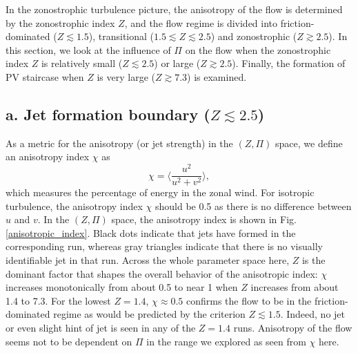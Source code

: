 \documentclass{ametsoc}
\begin{document}
In the zonostrophic turbulence picture, the anisotropy of the flow is
determined by the zonostrophic index $Z$, and the flow regime is
divided into friction-dominated ($Z\apprle1.5$), transitional ($1.5\apprle Z\apprle2.5$)
and zonostrophic ($Z\apprge2.5$). In this section, we look at the
influence of $\Pi$ on the flow when the zonostrophic index $Z$ is
relatively small ($Z\apprle2.5$) or large ($Z\apprge2.5$). Finally,
the formation of PV staircase when $Z$ is very large ($Z\apprge7.3$)
is examined.

\subsection*{a. Jet formation boundary ($Z\apprle2.5$)}

As a metric for the anisotropy (or jet strength)
in the $(Z,\Pi)$ space, we define an anisotropy index $\chi$ as
\begin{equation}
\chi=\langle\frac{u^{2}}{u^{2}+v^{2}}\rangle,
\end{equation}
which measures the percentage of energy in the zonal wind. For
isotropic turbulence, the anisotropy index $\chi$ should be 0.5
as there is no difference between $u$ and $v$. In the $(Z,\Pi)$
space, the anisotropy index is shown in Fig. \ref{anisotropic_index}.
Black dots indicate that jets have formed in the corresponding run,
whereas gray triangles indicate that there is no visually identifiable
jet in that run. Across the whole parameter space here, $Z$ is the
dominant factor that shapes the overall behavior of the anisotropic
index: $\chi$ increases monotonically from about 0.5 to near 1 when
$Z$ increases from about 1.4 to 7.3. For the lowest $Z=1.4$, $\chi\approx0.5$
confirms the flow to be in the friction-dominated regime as would
be predicted by the criterion $Z\apprle1.5$. Indeed, no jet or even
slight hint of jet is seen in any of the $Z=1.4$ runs. Anisotropy of the flow 
seems not to be dependent on $\Pi$ in the range we 
explored as seen from $\chi$ here.
\end{document}
